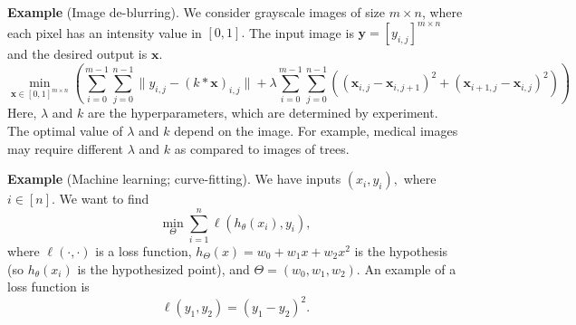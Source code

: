 \documentclass[twoside]{article}
\begin{document}

\textbf{Example} (Image de-blurring). We consider grayscale images of size $m
\times n$, where each pixel has an intensity value in $[0, 1].$ The input image
is $\mathbf{y} = [y_{i, j}]^{m \times n}$ and the desired output is
$\mathbf{x}.$
\[
    \min_{\mathbf{x} \in [0, 1]^{m \times n}}
    \left(
    \sum_{i = 0}^{m - 1} \sum_{j = 0}^{n - 1} \|y_{i, j} - (k * \mathbf{x})_{i, j}\| +
    \lambda \sum_{i = 0}^{m - 1} \sum_{j = 0}^{n - 1} ((\mathbf{x}_{i, j} - \mathbf{x}_{i, j + 1})^2 + (\mathbf{x}_{i + 1, j} - \mathbf{x}_{i, j})^2)
    \right)
\] Here, $\lambda$ and $k$ are the hyperparameters, which are determined by
experiment. The optimal value of $\lambda$ and $k$ depend on the image. For
example, medical images may require different $\lambda$ and $k$ as compared to
images of trees.


\textbf{Example} (Machine learning; curve-fitting). We have inputs $(x_i, y_i),$
where $i \in [n].$ We want to find \[
    \min_\Theta \sum_{i = 1}^{n} \ell(h_\theta(x_i), y_i),
\] where $\ell(\cdot, \cdot)$ is a loss function, $h_\Theta(x) = w_0 + w_1 x +
w_2 x^2$ is the hypothesis (so $h_\theta(x_i)$ is the hypothesized point), and
$\Theta = (w_0, w_1, w_2)$. An example of a loss function is \[
    \ell(y_1, y_2) = (y_1 - y_2)^2.
\] 
\end{document}
